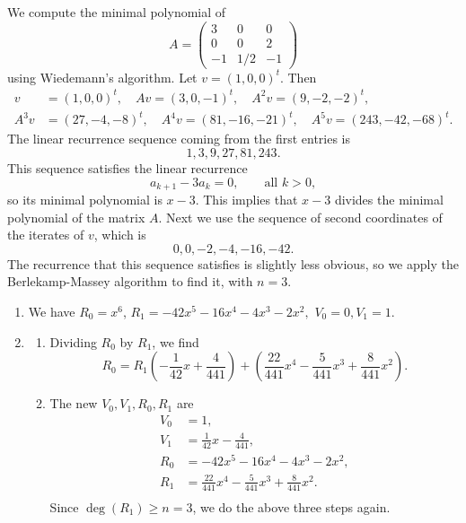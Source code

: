 \begin{example}
We compute the minimal polynomial of 
$$
A= \left(\begin{array}{ccc}
3&0&0\\
0&0&2\\
-1&1/2&-1
\end{array}\right)
$$
using Wiedemann's algorithm.
Let $v=(1,0,0)^t$.  Then 
\begin{align*}
  v&=(1,0,0)^t,\quad Av = (3,0,-1)^t,\quad A^2v = (9,-2,-2)^t, \\
  A^3v&=(27,-4,-8)^t, \quad A^4v=(81,-16,-21)^t, \quad A^5v=(243,-42,-68)^t.
\end{align*}
The linear recurrence sequence coming from the first entries is
$$
   1, 3, 9, 27, 81, 243.
$$
This sequence satisfies the linear recurrence
$$
    a_{k+1} -3 a_k = 0, \qquad\text{all $k>0$},
$$
so its minimal polynomial is $x-3$.  This implies that
$x-3$ divides the minimal polynomial of the matrix $A$.
Next we use the sequence of second coordinates of the 
iterates of $v$, which is
$$
  0, 0, -2, -4, -16, -42.
$$
The recurrence that this sequence satisfies is slightly 
less obvious, so we apply the Berlekamp-Massey algorithm
to find it, with $n=3$.
\begin{enumerate}
\item We have $R_0 = x^6$, 
$
 R_1 = -42x^5 - 16x^4 - 4x^3 - 2x^2,
$
$V_0 = 0, V_1 = 1$.

\item 
\begin{enumerate}
\item Dividing $R_0$ by $R_1$, we find
$$
  R_0 = R_1 \left(  -\frac{1}{42}x + \frac{4}{441}  \right) + 
    \left(\frac{22}{441}x^4 - \frac{5}{441}x^3 + \frac{8}{441}x^2 \right).
$$
\item The new $V_0, V_1, R_0, R_1$ are 
\begin{align*}
  V_0 &= 1,\\
  V_1 &= \frac{1}{42}x - \frac{4}{441},\\
  R_0 &= -42x^5 - 16x^4 - 4x^3 - 2x^2,\\
  R_1 &= \frac{22}{441}x^4 - \frac{5}{441}x^3 + \frac{8}{441}x^2.\\
\end{align*}
Since $\deg(R_1)\geq n=3$, we do the above three steps again.
\end{enumerate}


\end{enumerate}
\end{example}
